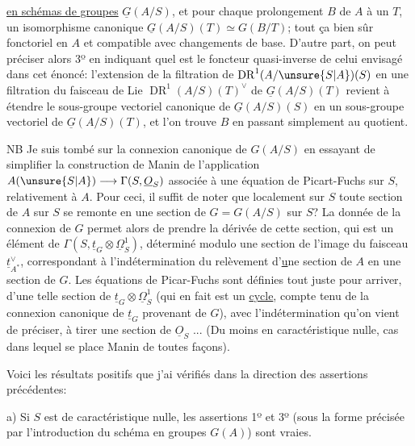 \uline{en schémas de groupes}  $\underline{G}(A/S)$, et pour chaque prolongement  $B$ de $A$ à un $T$, un isomorphisme canonique $\underline{G}(A/S)(T)\simeq G(B/T)$; tout ça bien sûr fonctoriel en $A$ et compatible avec changements de base. D'autre part, on peut préciser alors 3º en indiquant quel est le foncteur quasi-inverse de celui envisagé dans cet énoncé: l'extension de la filtration de $\operatorname{DR}^1(A/\unsure{S|A})(S)$ en une filtration du faisceau de Lie $\operatorname{DR}^1(A/S)(T)^{\vee}$ de $\underline{G}(A/S)(T)$ revient à étendre le sous-groupe vectoriel canonique de $\underline{G}(A/S)(S)$ en un sous-groupe vectoriel de $\underline{G}(A/S)(T)$, et l'on trouve $B$ en passant simplement au quotient.

NB Je suis tombé sur la connexion canonique de $G(A/S)$ en essayant de simplifier la construction de Manin de l'application $A(\unsure{S|A})\longrightarrow\Gamma(S,\underline{O}_S)$ associée à une équation de Picart-Fuchs sur $S$, relativement à $A$. Pour ceci, il suffit de noter que localement sur $S$ toute section de $A$ sur $S$ se remonte en une section de $G=G(A/S)$ sur $S$? La donnée de la connexion de $G$ permet alors de prendre la dérivée de cette section, qui est un élément de $\Gamma(S,\underline{t}_G\otimes\underline{\Omega}^1_S)$, déterminé modulo une section de l'image du faisceau $\underline{t}^{\vee}_{A^*}$, correspondant à l'indétermination du relèvement d'\uline{u}ne section de $A$ en une section de $G$. Les équations de Picar-Fuchs sont définies tout juste pour arriver, d'une telle section de  $\underline{t}_G\otimes\underline{\Omega}^1_S$ (qui en fait est un \uline{cycle}, compte tenu de la connexion canonique de $\underline{t}_G$ provenant de $G$), avec l'indétermination qu'on vient de préciser, à tirer une section de $\underline{O}_S$ ... (Du moins en caractéristique nulle, cas dans lequel se place Manin de toutes façons).


Voici les résultats positifs que j'ai vérifiés dans la direction des assertions précédentes:

a) Si $S$ est de caractéristique nulle, les assertions 1º et 3º (sous la forme précisée par l'introduction du schéma en groupes $G(A)$) sont vraies.

